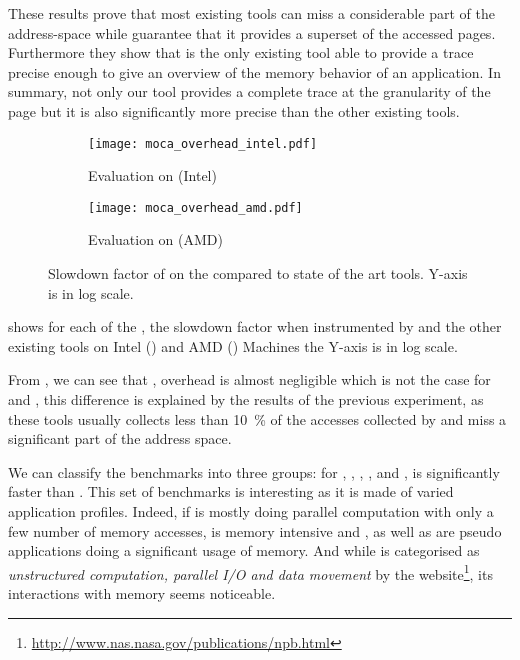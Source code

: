 These results prove that most existing tools can miss a considerable part of
the address-space while \Moca guarantee that it provides a superset of the accessed
pages. Furthermore they show that \Moca is the only existing tool able to provide a
trace precise enough to give an overview of the memory behavior of an application. In
summary, not only our tool provides a complete trace at the granularity of the
page but it is also significantly more precise than the other existing tools.

\begin{figure}[htb]
    \centering
    \begin{subfigure}{\linewidth}
        \texttt{[image: moca\_overhead\_intel.pdf]}
        \caption{Evaluation on \Edel (Intel)}
        \label{fig:ovh-Intel}
    \end{subfigure}
    \begin{subfigure}{\linewidth}
        \texttt{[image: moca\_overhead\_amd.pdf]}
        \caption{Evaluation on \Stremi (AMD)}
        \label{fig:ovh-AMD}
    \end{subfigure}
    \caption{Slowdown factor of \Moca on the \NPB compared to state of the art tools.
    Y-axis is in log scale.}
    \label{fig:ovh}
\end{figure}

 shows for each of the \NPB, the slowdown factor when
instrumented by \Moca and the other existing tools on Intel
() and AMD () Machines the Y-axis is in
log scale.

From , we can see that \Mitos, \MitosTun overhead is
almost negligible which is not the case for \Moca and \TABARNAC, this
difference is explained by the results of the previous experiment, as these
tools usually collects less than \SI{10}{\%} of the accesses collected by \Moca and
miss a significant part of the address space.

We can classify the benchmarks into three groups:
for \BT, \CG, \EP, \LU, \SP and \UA, \Moca is
significantly faster than \TABARNAC. This set of benchmarks is interesting as it is made of varied application profiles.
Indeed, if \EP is mostly doing parallel computation with only a few number of
memory accesses, \CG is memory intensive and
\BT, \LU as well as \SP are pseudo applications doing a significant usage of memory.
And while \UA is categorised as \emph{unstructured computation,
parallel I/O and data movement} by the \NPB
website\footnote{\url{http://www.nas.nasa.gov/publications/npb.html}}, its
interactions with memory seems noticeable.

